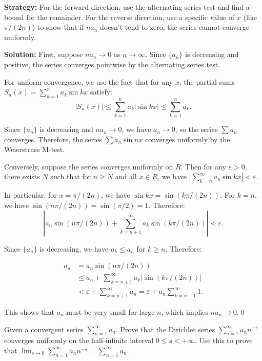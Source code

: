 \noindent\textbf{Strategy:} For the forward direction, use the alternating series test and find a bound for the remainder. For the reverse direction, use a specific value of \( x \) (like \( \pi/(2n) \)) to show that if \( na_n \) doesn't tend to zero, the series cannot converge uniformly.

\bigskip\noindent\textbf{Solution:} First, suppose \( na_n \to 0 \) as \( n \to \infty \). Since \( \{a_n\} \) is decreasing and positive, the series converges pointwise by the alternating series test.

For uniform convergence, we use the fact that for any \( x \), the partial sums \( S_n(x) = \sum_{k=1}^n a_k \sin kx \) satisfy:
\[|S_n(x)| \leq \sum_{k=1}^n a_k |\sin kx| \leq \sum_{k=1}^n a_k.\]

Since \( \{a_n\} \) is decreasing and \( na_n \to 0 \), we have \( a_n \to 0 \), so the series \( \sum a_n \) converges. Therefore, the series \( \sum a_n \sin nx \) converges uniformly by the Weierstrass M-test.

Conversely, suppose the series converges uniformly on \( R \). Then for any \( \varepsilon > 0 \), there exists \( N \) such that for \( n \geq N \) and all \( x \in R \), we have \( |\sum_{k=n}^{\infty} a_k \sin kx| < \varepsilon \).

In particular, for \( x = \pi/(2n) \), we have \( \sin kx = \sin(k\pi/(2n)) \). For \( k = n \), we have \( \sin(n\pi/(2n)) = \sin(\pi/2) = 1 \). Therefore:
\[|a_n \sin(n\pi/(2n)) + \sum_{k=n+1}^{\infty} a_k \sin(k\pi/(2n))| < \varepsilon.\]

Since \( \{a_n\} \) is decreasing, we have \( a_k \leq a_n \) for \( k \geq n \). Therefore:

\begin{align*}
a_n &= a_n \sin(n\pi/(2n)) \\ 
&\leq a_n + \sum_{k=n+1}^{\infty} a_k |\sin(k\pi/(2n))| \\ 
&< \varepsilon + \sum_{k=n+1}^{\infty} a_n = \varepsilon + a_n \sum_{k=n+1}^{\infty} 1.
\end{align*}

This shows that \( a_n \) must be very small for large \( n \), which implies \( na_n \to 0 \).\qed


\begin{problembox}
\begin{problemstatement}
Given a convergent series \(\sum_{n=1}^{\infty} a_n \). Prove that the Dirichlet series \(\sum_{n=1}^{\infty} a_n n^{-s}\) converges uniformly on the half-infinite interval \( 0 \leq s < +\infty \). Use this to prove that \(\lim_{s \to 0} \sum_{n=1}^{\infty} a_n n^{-s} = \sum_{n=1}^{\infty} a_n\).
\end{problemstatement}
\end{problembox}

